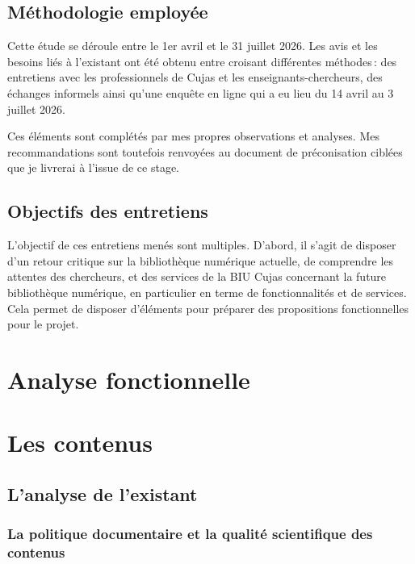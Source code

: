 \subsection*{Méthodologie employée}

Cette étude se déroule entre le 1er avril et le 31 juillet 2026. Les avis et les besoins liés à l’existant ont été obtenu entre croisant différentes méthodes : des entretiens avec les professionnels de Cujas et les enseignants-chercheurs, des échanges informels ainsi qu’une enquête en ligne qui a eu lieu du 14 avril au 3 juillet 2026. 

Ces éléments sont complétés par mes propres observations et analyses. Mes recommandations sont toutefois renvoyées au document de préconisation ciblées que je livrerai à l’issue de ce stage. 

\subsection*{Objectifs des entretiens}  

L’objectif de ces entretiens menés sont multiples. D’abord, il s’agit de disposer d’un retour critique sur la bibliothèque numérique actuelle, de comprendre les attentes des chercheurs, et des services de la BIU Cujas concernant la future bibliothèque numérique, en particulier en terme de fonctionnalités et de services. Cela permet de disposer d’éléments pour préparer des propositions fonctionnelles pour le projet. 


\section*{Analyse fonctionnelle} 

\section{Les contenus} 

\subsection{L’analyse de l’existant}

\subsubsection{La politique documentaire et la qualité scientifique des contenus} 

